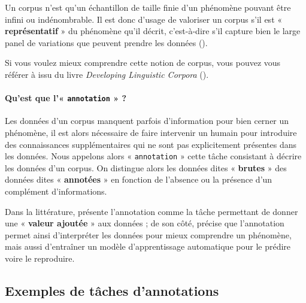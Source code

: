 			Un corpus n'est qu'un échantillon de taille finie d'un phénomène pouvant être infini ou indénombrable.
			Il est donc d'usage de valoriser un corpus s'il est « \textbf{représentatif} » du phénomène qu'il décrit, c'est-à-dire s'il capture bien le large panel de variations que peuvent prendre les données (\cite{biber:1993:representativeness-corpus-design}).
			
			\begin{leftBarInformation}
				Si vous voulez mieux comprendre cette notion de corpus, vous pouvez vous référer à \cite{sinclair:2004:corpus-text-basic} issu du livre \textit{Developing Linguistic Corpora} (\cite{wynne:2004:developing-linguistic-corpora}).
			\end{leftBarInformation}
			
			\paragraph{Qu'est que l'« \texttt{annotation} » ?}
			Les données d'un corpus manquent parfois d'information pour bien cerner un phénomène, il est alors nécessaire de faire intervenir un humain pour introduire des connaissances supplémentaires qui ne sont pas explicitement présentes dans les données.
			Nous appelons alors « \texttt{annotation} » cette tâche consistant à décrire les données d'un corpus.
			On distingue alors les données dites « \textbf{brutes} » des données dites « \textbf{annotées} » en fonction de l'absence ou la présence d'un complément d'informations.
			
			Dans la littérature, \cite{garside-etal:1997:corpus-annotation-linguistic} présente l'annotation comme la tâche permettant de donner une « \textbf{valeur ajoutée} » aux données ; de son côté, \cite{leech:2004:adding-linguistic-annotation} précise que l'annotation permet ainsi d'interpréter les données pour mieux comprendre un phénomène, mais aussi d'entraîner un modèle d'apprentissage automatique pour le prédire voire le reproduire.
		
		
		\subsection{Exemples de tâches d'annotations}
		\label{section:2.1.2-PRESENTATION-ANNOTATION-EXEMPLES}
			
